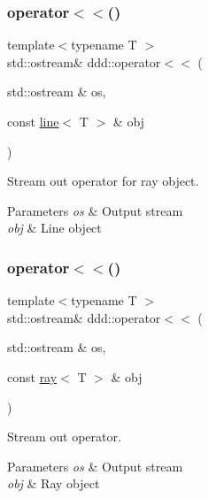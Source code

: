 \subsubsection{\texorpdfstring{operator$<$$<$()}{operator<<()}\hspace{0.1cm}{\footnotesize\ttfamily [3/10]}}
{\footnotesize\ttfamily template$<$typename T $>$ \\
std\+::ostream\& ddd\+::operator$<$$<$ (\begin{DoxyParamCaption}\item[{std\+::ostream \&}]{os,  }\item[{const \hyperlink{classddd_1_1line}{line}$<$ T $>$ \&}]{obj }\end{DoxyParamCaption})\hspace{0.3cm}{\ttfamily [inline]}}



Stream out operator for ray object. 


\begin{DoxyParams}{Parameters}
{\em os} & Output stream \\
\hline
{\em obj} & Line object \\
\hline
\end{DoxyParams}
\mbox{\label{namespaceddd_ae2604d6c72853dfb2595f6882cbc7a51}} 
\subsubsection{\texorpdfstring{operator$<$$<$()}{operator<<()}\hspace{0.1cm}{\footnotesize\ttfamily [4/10]}}
{\footnotesize\ttfamily template$<$typename T $>$ \\
std\+::ostream\& ddd\+::operator$<$$<$ (\begin{DoxyParamCaption}\item[{std\+::ostream \&}]{os,  }\item[{const \hyperlink{classddd_1_1ray}{ray}$<$ T $>$ \&}]{obj }\end{DoxyParamCaption})\hspace{0.3cm}{\ttfamily [inline]}}



Stream out operator. 


\begin{DoxyParams}{Parameters}
{\em os} & Output stream \\
\hline
{\em obj} & Ray object \\
\hline
\end{DoxyParams}
\mbox{\label{namespaceddd_af1faa02295670c7cfd7f0278e3973f84}} 
